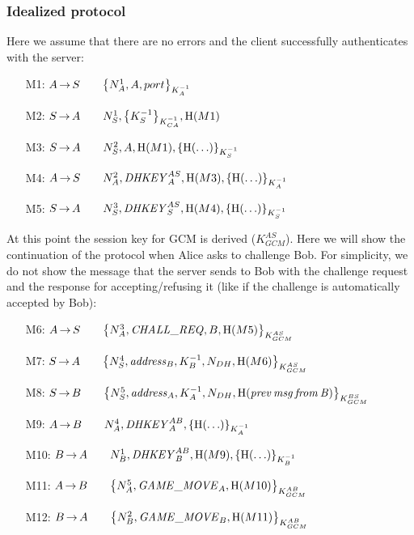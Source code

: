 \subsubsection{Idealized protocol}

Here we assume that there are no errors and the client successfully
authenticates with the server:
\begin{itemize}
	\item[M1:] \(A \operatorname{\rightarrow} S \qquad {\left\{N_A^1, A, port\right\}}_{K_A^{-1}}\)
	\item[M2:] \(S \operatorname{\rightarrow} A \qquad N_S^1, {\left\{K_S^{-1}\right\}}_{K_{CA}^{-1}}, \operatorname{H}(M1)\)
	\item[M3:] \(S \operatorname{\rightarrow} A \qquad N_S^2, A, \operatorname{H}(M1), {\left\{\operatorname{H}(\ldots)\right\}}_{K_S^{-1}}\)
	\item[M4:] \(A \operatorname{\rightarrow} S \qquad N_A^2, \mathit{DHKEY}_A^{AS}, \operatorname{H}(M3), {\left\{\operatorname{H}(\ldots)\right\}}_{K_A^{-1}}\)
	\item[M5:] \(S \operatorname{\rightarrow} A \qquad N_S^3, \mathit{DHKEY}_S^{AS}, \operatorname{H}(M4), {\left\{\operatorname{H}(\ldots)\right\}}_{K_S^{-1}}\)
\end{itemize}

At this point the session key for GCM is derived (\(K_{GCM}^{AS}\)). Here we will
show the continuation of the protocol when Alice asks to challenge Bob. For
simplicity, we do not show the message that the server sends to Bob with the
challenge request and the response for accepting/refusing it (like if the
challenge is automatically accepted by Bob):
\begin{itemize}
	\item[M6:] \(A \operatorname{\rightarrow} S \qquad {\left\{N_A^3, \mathit{CHALL\_REQ}, B, \operatorname{H}(M5)\right\}}_{K_{GCM}^{AS}}\)
	\item[M7:] \(S \operatorname{\rightarrow} A \qquad {\left\{N_S^4, \mathit{address}_B, K_B^{-1}, N_{DH}, \operatorname{H}(M6)\right\}}_{K_{GCM}^{AS}}\)
	\item[M8:] \(S \operatorname{\rightarrow} B \qquad {\left\{N_S^5, \mathit{address}_A, K_A^{-1}, N_{DH}, \operatorname{H}(\mathit{prev\,msg\,from\,B})\right\}}_{K_{GCM}^{BS}}\)
	\item[M9:] \(A \operatorname{\rightarrow} B \qquad N_A^4, \mathit{DHKEY}_A^{AB}, {\left\{\operatorname{H}(\ldots)\right\}}_{K_A^{-1}}\)
	\item[M10:] \(B \operatorname{\rightarrow} A \qquad N_B^1, \mathit{DHKEY}_B^{AB}, \operatorname{H}(M9), {\left\{\operatorname{H}(\ldots)\right\}}_{K_B^{-1}}\)
	\item[M11:] \(A \operatorname{\rightarrow} B \qquad {\left\{N_A^5, \mathit{GAME\_MOVE}_A, \operatorname{H}(M10)\right\}}_{K_{GCM}^{AB}}\)
	\item[M12:] \(B \operatorname{\rightarrow} A \qquad {\left\{N_B^2, \mathit{GAME\_MOVE}_B, \operatorname{H}(M11)\right\}}_{K_{GCM}^{AB}}\)
\end{itemize}

